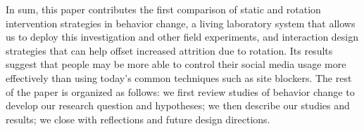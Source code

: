 In sum, this paper contributes the first comparison of static and rotation intervention strategies in behavior change, a living laboratory system that allows us to deploy this investigation and other field experiments, and interaction design strategies that can help offset increased attrition due to rotation. Its results suggest that people may be more able to control their social media usage more effectively than using today's common techniques such as site blockers. The rest of the paper is organized as follows: we first review studies of behavior change to develop our research question and hypotheses; we then describe our studies and results; we close with reflections and future design directions.







